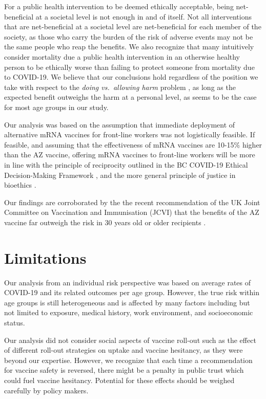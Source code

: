 \documentclass[]{interact}
\theoremstyle{plain}%
\theoremstyle{definition}
\theoremstyle{remark}
\begin{document}
For a public health intervention to be deemed ethically acceptable,
being net-beneficial at a societal level is not enough in and of itself.
Not all interventions that are net-beneficial at a societal level are
net-beneficial for each member of the society, as those who carry the
burden of the risk of adverse events may not be the same people who reap
the benefits. We also recognize that many intuitively consider mortality
due a public health intervention in an otherwise healthy person to be
ethically worse than failing to protect someone from mortality due to
COVID-19. We believe that our conclusions hold regardless of the
position we take with respect to the \emph{doing vs.~allowing harm}
problem \citep{woollard_doing_2016}, as long as the expected benefit
outweighs the harm at a personal level, as seems to be the case for most
age groups in our study.

Our analysis was based on the assumption that immediate deployment of
alternative mRNA vaccines for front-line workers was not logistically
feasible. If feasible, and assuming that the effectiveness of mRNA
vaccines are 10-15\% higher than the AZ vaccine, offering mRNA vaccines
to front-line workers will be more in line with the principle of
reciprocity outlined in the BC COVID-19 Ethical Decision-Making
Framework \citep{bccdc_covid-19_2020}, and the more general principle of
justice in bioethics \citep{mccormick_principles_2021}.

Our findings are corroborated by the the recent recommendation of the UK
Joint Committee on Vaccination and Immunisation (JCVI) that the benefits
of the AZ vaccine far outweigh the risk in 30 years old or older
recipients \citep{jcvi_jcvi_2021}.

\hypertarget{limitations}{%
\section{Limitations}\label{limitations}}

Our analysis from an individual risk perspective was based on average
rates of COVID-19 and its related outcomes per age group. However, the
true risk within age groups is still heterogeneous and is affected by
many factors including but not limited to exposure, medical history,
work environment, and socioeconomic status.

Our analysis did not consider social aspects of vaccine roll-out such as
the effect of different roll-out strategies on uptake and vaccine
hesitancy, as they were beyond our expertise. However, we recognize that
each time a recommendation for vaccine safety is reversed, there might
be a penalty in public trust which could fuel vaccine hesitancy.
Potential for these effects should be weighed carefully by policy
makers.
\end{document}

